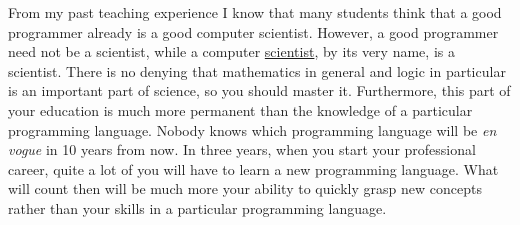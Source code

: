 From my past teaching experience I know that many students think that a good programmer already is a
good computer scientist.  However, a good programmer need not be a scientist, while a 
{\color{blue}computer \underline{scientist}}, by its very name, is a
{\color{blue}scientist}.  There is no denying that {\color{blue}mathematics} in general and 
{\color{blue}logic} in particular is an important part of science, so you should master it.  Furthermore, this
part of your education is much more permanent than the knowledge of a particular programming
language.  Nobody knows which programming language will be \emph{en vogue} in 10 years from now.  In three
years, when you start your professional career, quite a lot of you will have to learn a new
programming language.  What will count then will be much more your ability to quickly grasp new
concepts rather than your skills in a particular programming language.


